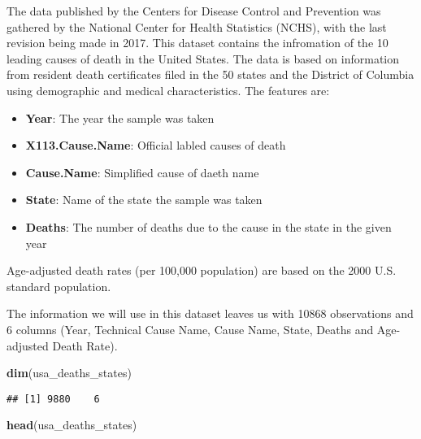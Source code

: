 \documentclass[]{article}
\newenvironment{Shaded}{\begin{snugshade}}{\end{snugshade}}
\newcommand{\KeywordTok}[1]{\textcolor[rgb]{0.13,0.29,0.53}{\textbf{#1}}}
\newcommand{\NormalTok}[1]{#1}
\providecommand{\tightlist}{%
  \setlength{\itemsep}{0pt}\setlength{\parskip}{0pt}}
\begin{document}
The data published by the Centers for Disease Control and Prevention was
gathered by the National Center for Health Statistics (NCHS), with the
last revision being made in 2017. This dataset contains the infromation
of the 10 leading causes of death in the United States. The data is
based on information from resident death certificates filed in the 50
states and the District of Columbia using demographic and medical
characteristics. The features are:

\begin{itemize}
\tightlist
\item
  \textbf{Year}: The year the sample was taken
\item
  \textbf{X113.Cause.Name}: Official labled causes of death
\item
  \textbf{Cause.Name}: Simplified cause of daeth name
\item
  \textbf{State}: Name of the state the sample was taken
\item
  \textbf{Deaths}: The number of deaths due to the cause in the state in
  the given year
\end{itemize}

Age-adjusted death rates (per 100,000 population) are based on the 2000
U.S. standard population.

The information we will use in this dataset leaves us with 10868
observations and 6 columns (Year, Technical Cause Name, Cause Name,
State, Deaths and Age-adjusted Death Rate).

\begin{Shaded}
\begin{Highlighting}[]
\KeywordTok{dim}\NormalTok{(usa_deaths_states)}
\end{Highlighting}
\end{Shaded}

\begin{verbatim}
## [1] 9880    6
\end{verbatim}

\begin{Shaded}
\begin{Highlighting}[]
\KeywordTok{head}\NormalTok{(usa_deaths_states)}
\end{Highlighting}
\end{Shaded}
\end{document}
